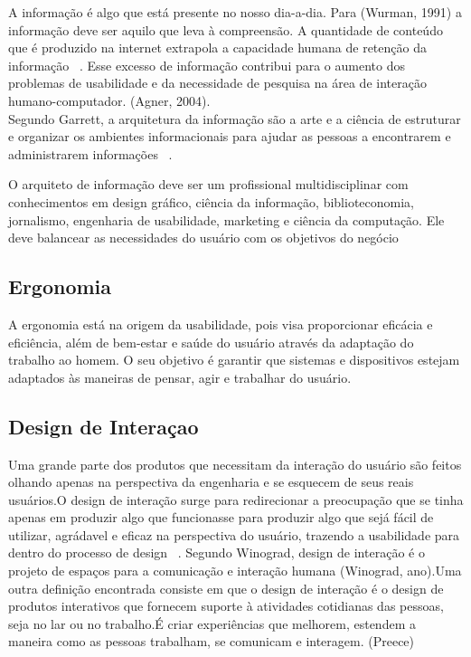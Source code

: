 A informação é algo que está presente no nosso dia-a-dia. Para (Wurman, 1991) a informação deve ser aquilo que leva à compreensão. A quantidade de conteúdo que é produzido na internet extrapola a capacidade humana de retenção da informação ~\cite{rosa2012}. Esse excesso de informação contribui para o aumento dos problemas de usabilidade e da necessidade de pesquisa na área de interação humano-computador. (Agner, 2004).\\

Segundo Garrett, a arquitetura da informação são a arte e a ciência de estruturar e organizar os ambientes informacionais para ajudar as pessoas a encontrarem e administrarem informações ~\cite{garret2003}.

O arquiteto de informação deve ser um profissional multidisciplinar com conhecimentos em design gráfico, ciência da informação, biblioteconomia, jornalismo, engenharia de usabilidade, marketing e ciência da computação. Ele deve balancear as necessidades do usuário com os objetivos do negócio~\cite{rosenfeld1998}

\subsection{Ergonomia}

A ergonomia está na origem da usabilidade, pois visa proporcionar eficácia e eficiência, além de bem-estar e saúde do usuário através da adaptação do trabalho ao homem. O seu objetivo é garantir que sistemas e dispositivos estejam adaptados às maneiras de pensar, agir e trabalhar do usuário. ~\cite{cybis2010}

\subsection{Design de Interaçao}

	Uma grande parte dos produtos que necessitam da interação do usuário são feitos olhando apenas na perspectiva da engenharia e se esquecem de seus reais usuários.O design de interação surge para redirecionar a preocupação que se tinha apenas em produzir algo que funcionasse para produzir algo que sejá fácil de utilizar, agrádavel e eficaz na perspectiva do usuário, trazendo a usabilidade para dentro do processo de design ~\cite{preece2007}.
	Segundo Winograd, design de interação é o projeto de espaços para a comunicação e interação humana (Winograd, ano).Uma outra definição encontrada consiste em que o design de interação é o design de produtos interativos que fornecem suporte à atividades cotidianas das pessoas, seja no lar ou no trabalho.É criar experiências que melhorem, estendem a maneira como as pessoas trabalham, se comunicam e interagem. (Preece)
	 

